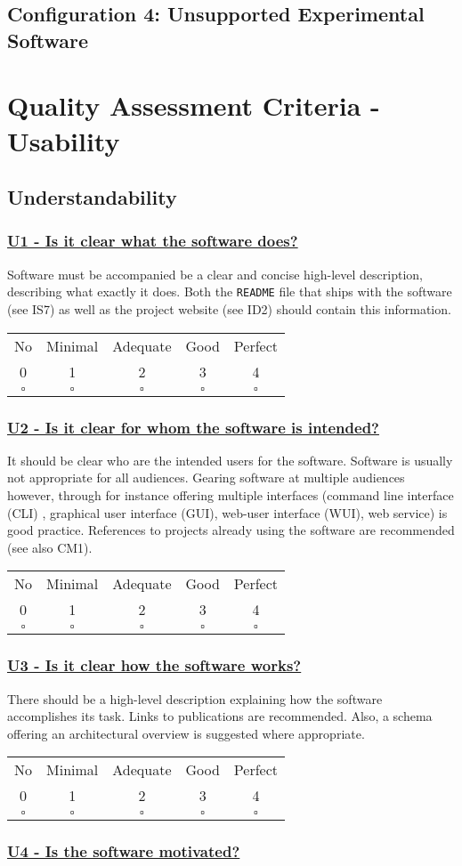 \documentclass[a4paper,11pt]{article}
\newcommand{\criterion}[2]{\subsubsection*{\underline{#1 - #2}}\label{id:#1}}
\newcommand\CheckTable{%
  \begin{tabular}{ccccc}
    No & Minimal & Adequate & Good & Perfect \\
    0 & 1 & 2 & 3 & 4 \\
    \hline
    $\square$ & $\square$ & $\square$ & $\square$ & $\square$ \\
  \end{tabular}%
}
\begin{document}
\subsection{Configuration 4: Unsupported Experimental Software} 





\section{Quality Assessment Criteria - Usability}\label{sec:usab}


\subsection{Understandability}\label{sec:und}

\newcommand{\uOneID}{U1}
\newcommand{\uOneText}{Is it clear what the software does?}
\criterion{\uOneID}{\uOneText}

Software must be accompanied be a clear and concise high-level description,
describing what exactly it does. Both the \texttt{README} file that ships with
the software (see IS7) as well as the project website (see ID2) should contain
this information. 

\CheckTable

\newcommand{\uTwoID}{U2}
\newcommand{\uTwoText}{Is it clear for whom the software is intended?}
\criterion{\uTwoID}{\uTwoText}

It should be clear who are the intended users for the software. Software is
usually not appropriate for all audiences. Gearing software at multiple
audiences however, through for instance offering multiple interfaces (command
line interface (CLI) , graphical user interface (GUI), web-user interface
(WUI), web service) is good practice. References to projects already using the
software are recommended (see also CM1).

\CheckTable

\newcommand{\uThreeID}{U3}
\newcommand{\uThreeText}{Is it clear how the software works?}
\criterion{\uThreeID}{\uThreeText}

There should be a high-level description explaining how the software
accomplishes its task. Links to publications are recommended. Also, a schema
offering an architectural overview is suggested where appropriate. 

\CheckTable

\newcommand{\uFourID}{U4}
\newcommand{\uFourText}{Is the software motivated?}
\criterion{\uFourID}{\uFourText}
\end{document}
